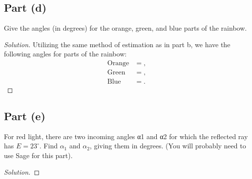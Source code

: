 \documentclass[letterpaper, 12pt]{amsart}
\theoremstyle{definition}  %
\begin{document}
		\subsection*{Part (d)}
		Give the angles (in degrees) for the orange, green, and blue parts of the rainbow.

		\begin{proof}[Solution]
		Utilizing the same method of estimation as in part b, we have the following angles for parts of the rainbow:
			\begin{align*}
				\text{Orange} &= , \\
				\text{Green} &= , \\
				\text{Blue} &= .
			\end{align*}
			
		\end{proof}

		\subsection*{Part (e)}
		For red light, there are two incoming angles α1 and α2 for which the reflected ray has $E = 23^{\circ}$. 
		Find $\alpha_{1}$ and $\alpha_{2}$, giving them in degrees. 
		(You will probably need to use Sage for this part).

		\begin{proof}[Solution]
		\end{proof}
\end{document}
